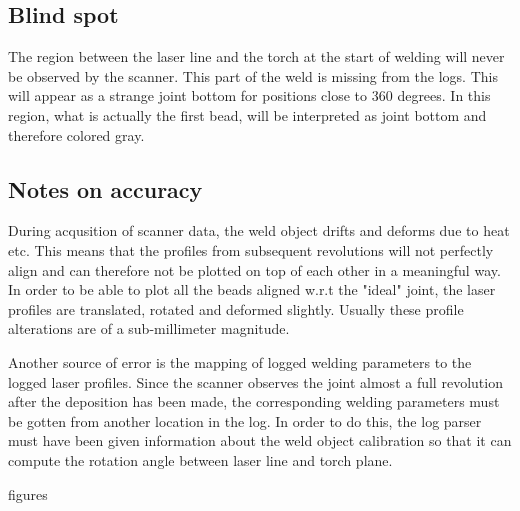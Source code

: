 \documentclass[12pt,a4paper]{report}
\begin{document}
\subsection{Blind spot}
The region between the laser line and the torch at the start of welding will never be observed by the scanner. This part of the weld is missing
from the logs. This will appear as a strange joint bottom for positions close to 360 degrees. In this region, what is actually the first bead,
will be interpreted as joint bottom and therefore colored gray.

\subsection{Notes on accuracy}
During acqusition of scanner data, the weld object drifts and deforms due to heat etc. This means that the profiles from subsequent
revolutions will not perfectly align and can therefore not be plotted on top of each other in a meaningful way.
In order to be able to plot all the beads aligned w.r.t the "ideal" joint, the laser profiles are translated, rotated and deformed
slightly. Usually these profile alterations are of a sub-millimeter magnitude. 

Another source of error is the mapping of logged welding parameters to the logged laser profiles. Since the scanner observes the
joint almost a full revolution after the deposition has been made, the corresponding welding parameters must be gotten from another
location in the log. In order to do this, the log parser must have been given information about the weld object calibration so that
it can compute the rotation angle between laser line and torch plane.


{figures}
\end{document}
